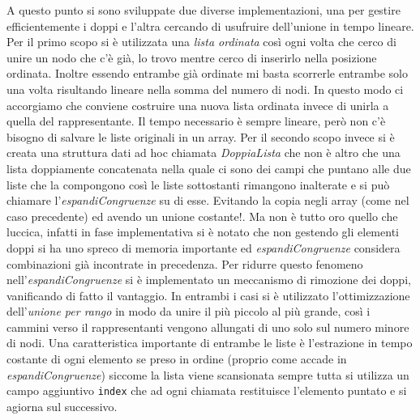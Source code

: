 \documentclass[a4paper,11pt]{article} %
\newcommand{\campo}{\texttt}
\begin{document}
A questo punto si sono sviluppate due diverse implementazioni, una per gestire
efficientemente i doppi e l'altra cercando di usufruire dell'unione in tempo lineare. %
Per il primo scopo si \`e utilizzata una \emph{lista ordinata} cos\`i ogni volta che cerco di unire
un nodo che c'\`e gi\`a, lo trovo mentre cerco di inserirlo nella posizione ordinata.
Inoltre essendo entrambe gi\`a ordinate mi basta scorrerle entrambe solo una volta
risultando lineare nella somma del numero di nodi. In questo modo ci accorgiamo che
conviene costruire una nuova lista ordinata invece di unirla a quella del rappresentante.
Il tempo necessario \`e sempre lineare, per\`o
non c'\`e bisogno di salvare le liste originali in un array.
Per il secondo scopo invece si \`e creata una struttura dati ad hoc chiamata \emph{DoppiaLista}
che non \`e altro che una lista doppiamente concatenata nella quale ci sono dei campi che
puntano alle due liste che la compongono cos\`i le liste sottostanti rimangono inalterate
e si pu\`o chiamare l'\emph{espandiCongruenze} su di esse. Evitando la copia negli array 
(come nel caso precedente) ed avendo un unione costante!.  Ma non \`e tutto oro quello
che luccica, infatti in fase implementativa si \`e notato che non gestendo gli elementi doppi
si ha uno spreco di memoria importante ed %
\emph{espandiCongruenze} considera combinazioni gi\`a incontrate in precedenza.
Per ridurre questo fenomeno nell'\emph{espandiCongruenze} si \`e implementato un meccanismo 
di rimozione dei doppi, vanificando di fatto il vantaggio.
In entrambi i casi si \`e utilizzato l'ottimizzazione dell'\emph{unione per rango}
in modo da unire il pi\`u piccolo al pi\`u grande, cos\`i i cammini verso il rappresentanti
vengono allungati di uno solo sul numero minore di nodi.
Una caratteristica importante di entrambe le liste \`e l'estrazione in tempo costante
di ogni elemento se preso in ordine (proprio come accade in \emph{espandiCongruenze})
siccome la lista viene scansionata sempre tutta si utilizza un campo aggiuntivo \campo{index}
che ad ogni chiamata restituisce l'elemento puntato e si agiorna sul successivo.
\end{document}

